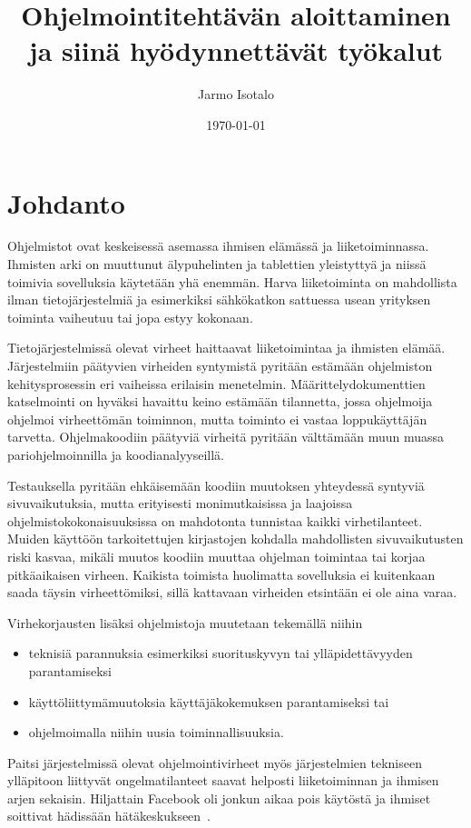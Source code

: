 \documentclass[finnish]{tktltiki2}
\title{Ohjelmointitehtävän aloittaminen ja siinä hyödynnettävät työkalut}
\author{Jarmo Isotalo}
\date{\today}
\theoremstyle{definition}
\theoremstyle{remark}
\begin{document}

\frontmatter      %

\maketitle        %
\makeabstract     %

\tableofcontents  %


\mainmatter       %

\section{Johdanto}

Ohjelmistot ovat keskeisessä asemassa ihmisen elämässä ja liiketoiminnassa. Ihmisten arki on muuttunut älypuhelinten ja tablettien yleistyttyä ja niissä toimivia sovelluksia käytetään yhä enemmän. Harva liiketoiminta on mahdollista ilman tietojärjestelmiä ja esimerkiksi sähkökatkon sattuessa usean yrityksen toiminta vaiheutuu tai jopa estyy kokonaan.

Tietojärjestelmissä olevat virheet haittaavat liiketoimintaa ja ihmisten elämää. Järjestelmiin päätyvien virheiden syntymistä pyritään estämään ohjelmiston kehitysprosessin eri vaiheissa erilaisin menetelmin. Määrittelydokumenttien katselmointi on hyväksi havaittu keino estämään tilannetta, jossa ohjelmoija ohjelmoi virheettömän toiminnon, mutta toiminto ei vastaa loppukäyttäjän tarvetta. Ohjelmakoodiin päätyviä virheitä pyritään välttämään muun muassa pariohjelmoinnilla ja koodianalyyseillä.

Testauksella pyritään ehkäisemään koodiin muutoksen yhteydessä syntyviä sivuvaikutuksia, mutta erityisesti monimutkaisissa ja laajoissa ohjelmistokokonaisuuksissa on mahdotonta tunnistaa kaikki virhetilanteet. Muiden käyttöön tarkoitettujen kirjastojen kohdalla mahdollisten sivuvaikutusten riski kasvaa, mikäli muutos koodiin muuttaa ohjelman toimintaa tai korjaa pitkäaikaisen virheen. Kaikista toimista huolimatta sovelluksia ei kuitenkaan saada täysin virheettömiksi, sillä kattavaan virheiden etsintään ei ole aina varaa.

Virhekorjausten lisäksi ohjelmistoja muutetaan tekemällä niihin
\begin{itemize}
  \item teknisiä parannuksia esimerkiksi suorituskyvyn tai ylläpidettävyyden parantamiseksi
  \item käyttöliittymämuutoksia käyttäjäkokemuksen parantamiseksi tai
  \item ohjelmoimalla niihin uusia toiminnallisuuksia.
\end{itemize}
Paitsi järjestelmissä olevat ohjelmointivirheet myös järjestelmien tekniseen ylläpitoon liittyvät ongelmatilanteet saavat helposti liiketoiminnan ja ihmisen arjen sekaisin. Hiljattain Facebook oli jonkun aikaa pois käytöstä ja ihmiset soittivat hädissään hätäkeskukseen~\cite{facebook-down}.
\end{document}
